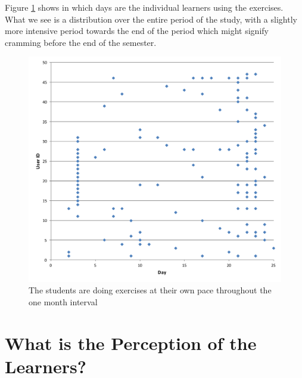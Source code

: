 
Figure \ref{fig:activity_per_day} shows in which days are the individual learners using the exercises. What we see is a distribution over the entire period of the study, with a slightly more intensive period towards the end of the period which might signify cramming before the end of the semester.

  \begin{figure}[h!]
  \centering
    \includegraphics[width=\columnwidth]{figures/user_exercise_activity_vs_day.pdf}
    \caption{The students are doing exercises at their own pace throughout the one month interval }
    \label{fig:activity_per_day}
  \end{figure}

\newpage
\section{What is the Perception of the Learners?}

